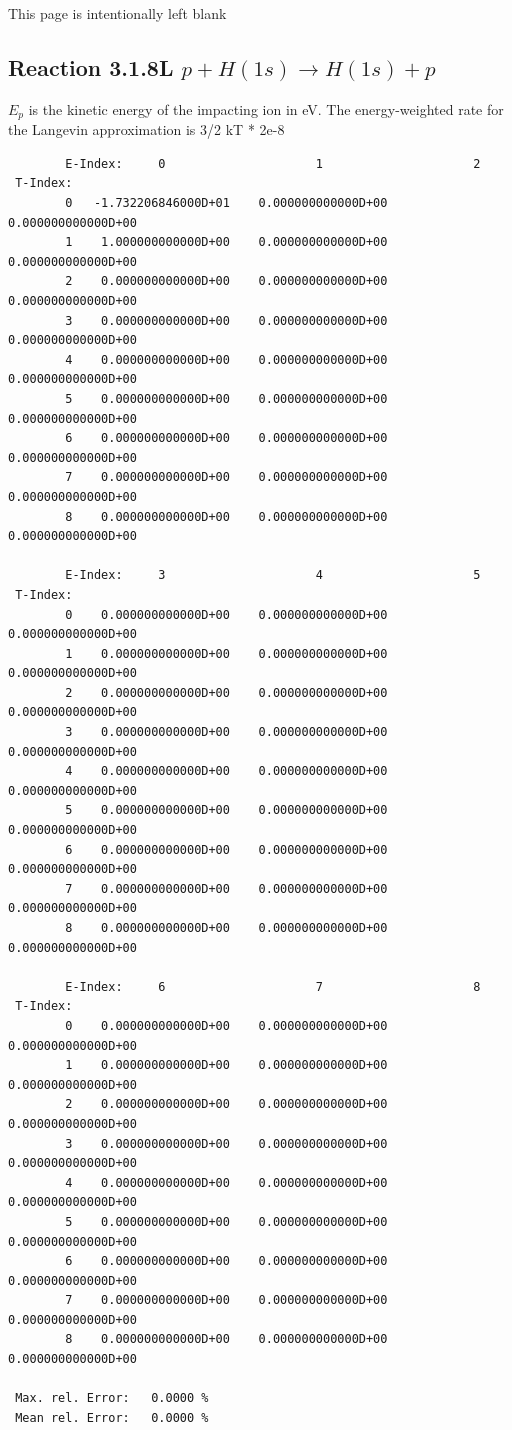 \documentclass[12pt,dvipdfmx]{article}
\begin{document}
\newpage
This page is intentionally left blank
\newpage
\subsection{
Reaction 3.1.8L  $p + H(1s)  \rightarrow  H(1s) + p $
}
$E_p$ is the kinetic energy of the impacting ion in eV.
The energy-weighted rate for the Langevin approximation is
3/2 kT * 2e-8

\begin{small}\begin{verbatim}
        E-Index:     0                     1                     2
 T-Index:
        0   -1.732206846000D+01    0.000000000000D+00    0.000000000000D+00
        1    1.000000000000D+00    0.000000000000D+00    0.000000000000D+00
        2    0.000000000000D+00    0.000000000000D+00    0.000000000000D+00
        3    0.000000000000D+00    0.000000000000D+00    0.000000000000D+00
        4    0.000000000000D+00    0.000000000000D+00    0.000000000000D+00
        5    0.000000000000D+00    0.000000000000D+00    0.000000000000D+00
        6    0.000000000000D+00    0.000000000000D+00    0.000000000000D+00
        7    0.000000000000D+00    0.000000000000D+00    0.000000000000D+00
        8    0.000000000000D+00    0.000000000000D+00    0.000000000000D+00

        E-Index:     3                     4                     5
 T-Index:
        0    0.000000000000D+00    0.000000000000D+00    0.000000000000D+00
        1    0.000000000000D+00    0.000000000000D+00    0.000000000000D+00
        2    0.000000000000D+00    0.000000000000D+00    0.000000000000D+00
        3    0.000000000000D+00    0.000000000000D+00    0.000000000000D+00
        4    0.000000000000D+00    0.000000000000D+00    0.000000000000D+00
        5    0.000000000000D+00    0.000000000000D+00    0.000000000000D+00
        6    0.000000000000D+00    0.000000000000D+00    0.000000000000D+00
        7    0.000000000000D+00    0.000000000000D+00    0.000000000000D+00
        8    0.000000000000D+00    0.000000000000D+00    0.000000000000D+00

        E-Index:     6                     7                     8
 T-Index:
        0    0.000000000000D+00    0.000000000000D+00    0.000000000000D+00
        1    0.000000000000D+00    0.000000000000D+00    0.000000000000D+00
        2    0.000000000000D+00    0.000000000000D+00    0.000000000000D+00
        3    0.000000000000D+00    0.000000000000D+00    0.000000000000D+00
        4    0.000000000000D+00    0.000000000000D+00    0.000000000000D+00
        5    0.000000000000D+00    0.000000000000D+00    0.000000000000D+00
        6    0.000000000000D+00    0.000000000000D+00    0.000000000000D+00
        7    0.000000000000D+00    0.000000000000D+00    0.000000000000D+00
        8    0.000000000000D+00    0.000000000000D+00    0.000000000000D+00

 Max. rel. Error:   0.0000 %
 Mean rel. Error:   0.0000 %
\end{verbatim}\end{small}
\end{document}
